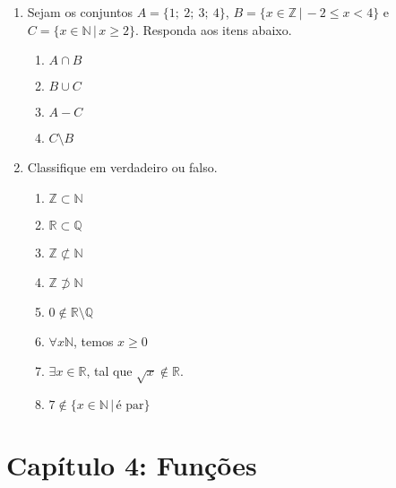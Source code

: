 \documentclass[a4paper, 12pt]{article}
\begin{document}
\begin{enumerate}
    \item Sejam os conjuntos $A = \{1;\ 2;\ 3;\ 4\}$,
    $B = \{x \in \mathbb{Z}\, |\, -2 \leq x < 4\}$ e 
    $C = \{x \in \mathbb{N} \, |\, x \geq 2\}$. Responda aos itens abaixo.

    \begin{enumerate}
        \item $A \cap B$
        \item $B \cup C$
        \item $A - C$
        \item $C\setminus B$
    \end{enumerate}

    \item Classifique em verdadeiro ou falso.
    \begin{enumerate}
        \item $\mathbb{Z} \subset \mathbb{N}$
        \item $\mathbb{R} \subset \mathbb{Q}$
        \item $\mathbb{Z} \not\subset \mathbb{N}$
        \item $\mathbb{Z} \not\supset \mathbb{N}$
        \item $0 \not\in \mathbb{R}\setminus\mathbb{Q}$
        \item $\forall x \mathbb{N}$, temos $x\geq 0$
        \item $\exists x \in \mathbb{R}$, tal que $\sqrt{x}\not\in\mathbb{R}$.
        \item $7 \not\in \{x\in \mathbb{N} \, |\, \textrm{é par}\}$
    \end{enumerate}
\end{enumerate}

\section*{Capítulo 4: Funções}
\end{document}
